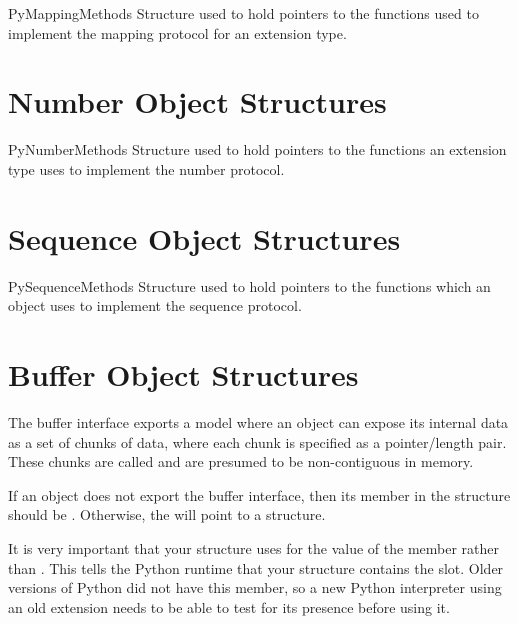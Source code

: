 \documentclass{manual}
\begin{document}
\begin{ctypedesc}{PyMappingMethods}
Structure used to hold pointers to the functions used to implement the 
mapping protocol for an extension type.
\end{ctypedesc}


\section{Number Object Structures \label{number-structs}}

\begin{ctypedesc}{PyNumberMethods}
Structure used to hold pointers to the functions an extension type
uses to implement the number protocol.
\end{ctypedesc}


\section{Sequence Object Structures \label{sequence-structs}}

\begin{ctypedesc}{PySequenceMethods}
Structure used to hold pointers to the functions which an object uses
to implement the sequence protocol.
\end{ctypedesc}


\section{Buffer Object Structures \label{buffer-structs}}

The buffer interface exports a model where an object can expose its
internal data as a set of chunks of data, where each chunk is
specified as a pointer/length pair.  These chunks are called
 and are presumed to be non-contiguous in memory.

If an object does not export the buffer interface, then its
 member in the  structure
should be \NULL{}.  Otherwise, the  will point to
a  structure.

 It is very important that your
 structure uses  for the
value of the  member rather than .  This
tells the Python runtime that your  structure
contains the  slot. Older versions of Python
did not have this member, so a new Python interpreter using an old
extension needs to be able to test for its presence before using it.
\end{document}
